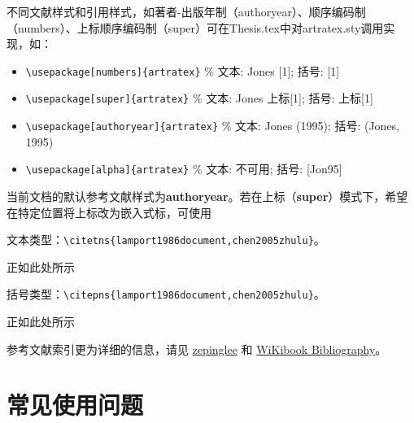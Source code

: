     不同文献样式和引用样式，如著者-出版年制（authoryear）、顺序编码制（numbers）、上标顺序编码制（super）可在Thesis.tex中对artratex.sty调用实现，如：
    \begin{itemize}
            \footnotesize
            \item \verb+\usepackage[numbers]{artratex}+ $\%$ 文本: Jones [1]; 括号: [1]
            \item \verb+\usepackage[super]{artratex}+ $\%$ 文本: Jones 上标[1]; 括号: 上标[1]
            \item \verb+\usepackage[authoryear]{artratex}+ $\%$ 文本: Jones (1995); 括号: (Jones, 1995)
            \item \verb+\usepackage[alpha]{artratex}+ $\%$ 文本: 不可用; 括号: [Jon95]
    \end{itemize}

    当前文档的默认参考文献样式为\textbf{authoryear}。若在上标（\textbf{super}）模式下，希望在特定位置将上标改为嵌入式标，可使用

    文本类型：\verb|\citetns{lamport1986document,chen2005zhulu}|。

    正如此处所示

    括号类型：\verb|\citepns{lamport1986document,chen2005zhulu}|。

    正如此处所示

    参考文献索引更为详细的信息，请见 \href{https://github.com/zepinglee/gbt7714-bibtex-style}{zepinglee} 和 \href{https://en.wikibooks.org/wiki/LaTeX/Bibliography_Management}{WiKibook Bibliography}。

    \nocite{*}

    \section{常见使用问题}\label{sec:qa}


